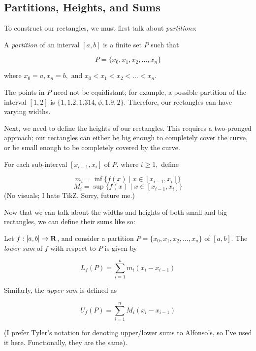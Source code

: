 \documentclass{article}
\begin{document}
      

  \subsection{Partitions, Heights, and Sums}
      To construct our rectangles, we must first talk about \emph{partitions}:

      \begin{defi}[Partitions]
        A \emph{partition} of an interval \([a,b]\) is a finite set \(P\) such that 

        \[
          P = \{x_0,x_1,x_2, \ldots, x_n\}
        \]
         
        \noindent
        where \(x_0 = a, x_n = b,\) and \(x_0 < x_1 < x_2 < \ldots < x_n.\)
      \end{defi}

      The points in \(P\) need not be equidistant; for example, a possible partition of the interval \([1,2]\) is \(\{1, 1.2, 1.314, \phi, 1.9, 2\}.\) Therefore, our rectangles can have varying widths.

      Next, we need to define the heights of our rectangles. This requires a two-pronged approach; our rectangles can either be big enough to completely cover the curve, or be small enough to be completely covered by the curve. 

      \begin{defi}
        For each sub-interval \([x_{i-1},x_i]\) of \(P\), where \(i \geq 1,\) define

        \[
          m_i = \inf\{f(x) \mid x \in [x_{i-1},x_i]\}
        \]
        \[
          M_i = \sup\{f(x) \mid x \in [x_{i-1},x_i]\}
        \]
        (No visuals; I hate TikZ. Sorry, future me.)
      \end{defi}

      Now that we can talk about the widths and heights of both small and big rectangles, we can define their sums like so:

      \begin{defi}
        Let \(f:[a,b] \to \mathbf{R}\), and consider a partition \(P = \{x_0,x_1,x_2, \ldots, x_n\}\) of \([a,b]\). The \emph{lower sum} of \(f\) with respect to \(P\) is given by

        \[
          L_f(P) = \sum_{i=1}^{n}{m_i(x_i-x_{i-1})}
        \]

        Similarly, the \emph{upper sum} is defined as 

        \[
          U_f(P) = \sum_{i=1}^{n}{M_i(x_i-x_{i-1})}
        \]

        (I prefer Tyler's notation for denoting upper/lower sums to Alfonso's, so I've used it here. Functionally, they are the same).
      \end{defi}
      
\end{document}
